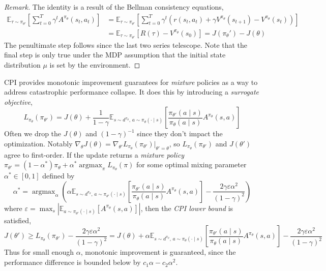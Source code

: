 \documentclass[11pt, letterpaper]{article}
\DeclareMathOperator*{\argmax}{argmax}
\let\geq\geqslant
\newenvironment{remark}
    {\renewcommand\qedsymbol{\(\blacksquare\)}\begin{proof}[Remark]}
    {\end{proof}}
\begin{document}
\begin{remark}
    The identity is a result of the Bellman consistency equations,
    \begin{align*}
        \mathbb{E}_{\tau \sim \pi_{\theta'}} \left[ \sum_{t=0}^T \gamma^t A^{\pi_\theta}(s_t, a_t) \right]
        &= \mathbb{E}_{\tau \sim \pi_{\theta'}} \left[ \sum_{t=0}^T \gamma^t (r(s_t, a_t) + \gamma V^{\pi_\theta}(s_{t+1}) - V^{\pi_\theta}(s_t)) \right] \\
        &= \mathbb{E}_{\tau \sim \pi_{\theta'}} [R(\tau) - V^{\pi_\theta}(s_0)]
        = J(\pi_\theta') - J(\theta)
    \end{align*}
    The penultimate step follows since the last two series telescope. Note that the final step is only true under the MDP assumption that the initial state distribution \(\mu\) is set by the environment. 
\end{remark}

\begin{concept}
    CPI provides monotonic improvement guarantees for \textit{mixture} policies as a way to address catastrophic performance collapse. It does this by introducing a \textit{surrogate objective}, 
    \[
        L_{\pi_\theta}(\pi_{\theta'}) 
        = J(\theta) + \frac{1}{1 - \gamma} \mathbb{E}_{s \sim d^{\pi_\theta},\, a \sim \pi_\theta(\cdot \mid s)} \left[ \frac{\pi_{\theta'}(a \mid s)}{\pi_\theta(a \mid s)} A^{\pi_\theta}(s, a) \right]
    \]
    Often we drop the \(J(\theta)\) and \((1 - \gamma)^{-1}\) since they don't impact the optimization. Notably \(\nabla_\theta J(\theta) = \nabla_{\theta'} L_{\pi_\theta}(\pi_{\theta'}) \rvert_{\theta' = \theta}\), so \(L_{\pi_\theta}(\pi_{\theta'})\) and \(J(\theta')\) agree to first-order. If the update returns a \textit{mixture policy} \(\pi_{\theta'} = (1 - \alpha^*) \pi_\theta + \alpha^* \argmax_{\pi} L_{\pi_\theta}(\pi)\) for some optimal mixing parameter \(\alpha^* \in [0,1]\) defined by 
    \[
        \alpha^* = \argmax_\alpha \left( \alpha \mathbb{E}_{s \sim d^{\pi_\theta},\, a \sim \pi_{\theta'}(\cdot \mid s)}\left[\frac{\pi_{\theta'}(a \mid s)}{\pi_\theta(a \mid s)} A^{\pi_\theta}(s, a)\right] - \frac{2\gamma\varepsilon\alpha^2}{(1 - \gamma)^2} \right)
    \]
    where \(\varepsilon = \max_s |\mathbb{E}_{a \sim \pi_{\theta'}(\cdot \mid s)} [A^{\pi_\theta}(s, a)]|\), then the \textit{CPI lower bound} is satisfied, 
    \[
        J(\theta') \geq L_{\pi_\theta}(\pi_{\theta'}) - \frac{2\gamma\varepsilon\alpha^2}{(1 - \gamma)^2}
        = J(\theta) + \alpha \mathbb{E}_{s \sim d^{\pi_\theta},\, a \sim \pi_\theta(\cdot \mid s)}\left[ \frac{\pi_{\theta'}(a \mid s)}{\pi_\theta(a \mid s)} A^{\pi_\theta}(s, a)\right] - \frac{2\gamma\varepsilon\alpha^2}{(1 - \gamma)^2}
    \]
    Thus for small enough \(\alpha\), monotonic improvement is guaranteed, since the performance difference is bounded below by \(c_1 \alpha - c_2 \alpha^2\). 
\end{concept}
\end{document}
